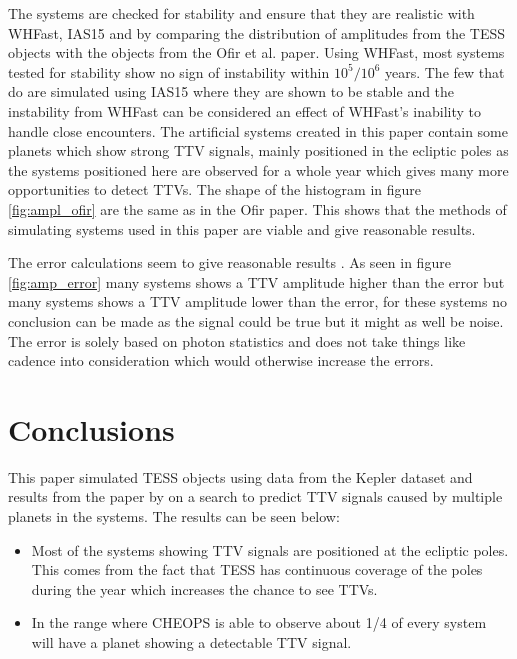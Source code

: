 \documentclass[12pt]{report}
\begin{document}
	The systems are checked for stability and ensure that they are realistic with WHFast, IAS15 and by comparing the distribution of amplitudes from the TESS objects with the objects from the Ofir et al. paper. Using WHFast, most systems tested for stability show no sign of instability within $10^5 / 10^6$ years. The few that do are simulated using IAS15 where they are shown to be stable and the instability from WHFast can be considered an effect of WHFast's inability to handle close encounters. The artificial systems created in this paper contain some planets which show strong TTV signals, mainly positioned in the ecliptic poles as the systems positioned here are observed for a whole year which gives many more opportunities to detect TTVs. The shape of the histogram in figure \ref{fig:ampl_ofir} are the same as in the Ofir paper. This shows that the methods of simulating systems used in this paper are viable and give reasonable results.
	
	The error calculations seem to give reasonable results \citep{2015ApJ...812L..18B}. As seen in figure \ref{fig:amp_error} many systems shows a TTV amplitude higher than the error but many systems shows a TTV amplitude lower than the error, for these systems no conclusion can be made as the signal could be true but it might as well be noise. The error is solely based on photon statistics and does not take things like cadence into consideration which would otherwise increase the errors. 
	
\chapter{Conclusions}
	This paper simulated TESS objects using data from the Kepler dataset and results from the paper by \cite{2015ApJ...809...77S} on a search to predict TTV signals caused by multiple planets in the systems. The results can be seen below:
	\begin{itemize}
		\item Most of the systems showing TTV signals are positioned at the ecliptic poles. This comes from the fact that TESS has continuous coverage of the poles during the year which increases the chance to see TTVs.
		\item In the range where CHEOPS is able to observe about 1/4 of every system will have a planet showing a detectable TTV signal.
	\end{itemize}
\end{document}
